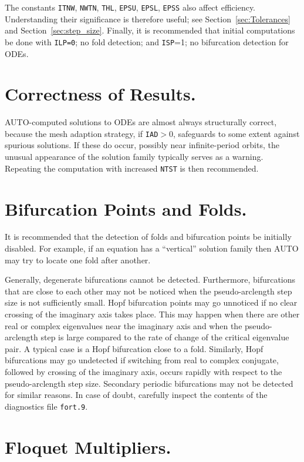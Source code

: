 \documentclass[12pt]{report}
\begin{document}
The constants {\tt ITNW}, {\tt NWTN}, {\tt THL}, {\tt EPSU}, {\tt EPSL}, {\tt EPSS} 
also affect efficiency.
Understanding their significance is therefore useful; 
see Section~\ref{sec:Tolerances} and Section~\ref{sec:step_size}.
Finally, it is recommended that initial computations be done with 
{\tt ILP=0}; no fold detection;
and {\tt ISP}=1; no bifurcation detection for ODEs.
 
\section{ Correctness of Results.} \label{sec:Correctness}
{\cal AUTO}-computed solutions to ODEs are almost always structurally correct,
because the mesh adaption strategy, if {\tt IAD}$>$0, safeguards to some extent
against spurious solutions.
If these do occur, possibly near infinite-period orbits,
the unusual appearance of the solution family typically serves as a warning.
Repeating the computation with increased {\tt NTST} is then recommended.

\section{ Bifurcation Points and Folds.} \label{sec:Bifurcations}
It is recommended that the detection of folds 
and bifurcation points be initially disabled.
For example, if an equation has a ``vertical'' solution family
then {\cal AUTO} may try to locate one fold after another.

Generally, degenerate bifurcations cannot be detected.
Furthermore, bifurcations that are close to each other may not
be noticed when the pseudo-arclength step size is not sufficiently small.
Hopf bifurcation points may go unnoticed if no clear crossing of
the imaginary axis takes place. This may happen when there are other
real or complex eigenvalues near the imaginary axis and when 
the pseudo-arclength step is large compared to the rate
of change of the critical eigenvalue pair.
A typical  case is a Hopf bifurcation close to a fold.
Similarly, Hopf bifurcations may go undetected if switching from
real to complex conjugate, followed by crossing of the imaginary
axis, occurs rapidly with respect to the pseudo-arclength step size.
Secondary periodic bifurcations may not be detected for similar reasons.
In case of doubt, carefully inspect the contents of the diagnostics file
{\tt fort.9}.
 
\section{ Floquet Multipliers.} \label{sec:Floquet_multipliers}
\end{document}
